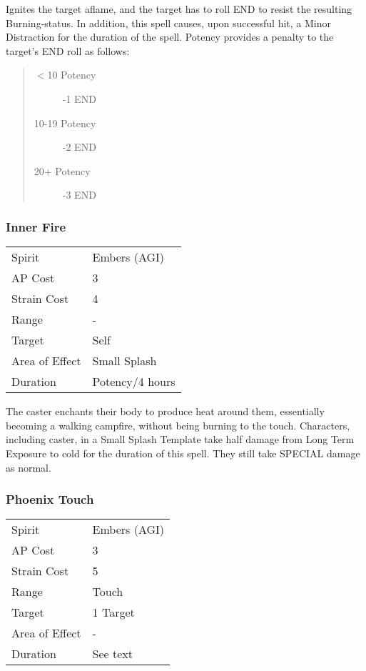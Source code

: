\documentclass[11pt,a4paper,twocolumn]{book}
\begin{document}
Ignites the target aflame, and the target has to roll END to resist the resulting Burning-status. In addition, this spell causes, upon successful hit, a Minor Distraction for the duration of the spell. Potency provides a penalty to the target's END roll as follows:
\begin{quote}
	\begin{description}
		\item[$<$10 Potency] 	-1 END
		\item[10-19 Potency] 	-2 END
		\item[20+ Potency]  	-3 END
	\end{description}	
\end{quote}

\subsubsection*{Inner Fire}
{
	\begin{tabu} to 75mm{| X[l,4] | X[l,7] |}
		\hline
		Spirit 			&  Embers (AGI)			\\
		AP Cost	      	&  3					\\
		Strain Cost     &  4					\\
		Range     		&  -					\\
		Target      	&  Self					\\
		Area of Effect  &  Small Splash	 		\\
		Duration     	&  Potency/4 hours		\\ \hline
	\end{tabu}
	
}

\medskip

The caster enchants their body to produce heat around them, essentially becoming a walking campfire, without being burning to the touch. Characters, including caster, in a Small Splash Template take half damage from Long Term Exposure to cold for the duration of this spell. They still take SPECIAL damage as normal.

\subsubsection*{Phoenix Touch}
{
	\begin{tabu} to 75mm{| X[l,4] | X[l,7] |}
		\hline
		Spirit         & Embers (AGI) \\
		AP Cost        & 3            \\
		Strain Cost    & 5            \\
		Range          & Touch        \\
		Target         & 1 Target     \\
		Area of Effect & -            \\
		Duration       & See text     \\ \hline
	\end{tabu}
	
}
\end{document}
